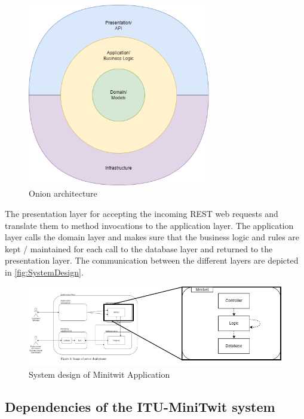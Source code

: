 \begin{figure}[!ht]
    \centering
    \includegraphics[width=80mm]{images/diagrams/ApplicationOverview.png}
    \captionsetup{justification=centering,margin=1cm}
    \caption{Onion architecture}
    \label{fig:onion_architecture}
\end{figure}


The presentation layer for accepting the incoming REST web requests and translate them to method invocations to the application layer. The application layer calls the domain layer and makes sure that the business logic and rules are kept / maintained for each call to the database layer and returned to the presentation layer. The communication between the different layers are depicted in \autoref{fig:SystemDesign}.

\begin{figure}[!ht]
    \centering
    \captionsetup{justification=centering,margin=1cm}
    \includegraphics[width=\linewidth]{images/diagrams/system-design-version2.drawio.png}
    \caption{System design of Minitwit Application}
    \label{fig:SystemDesign}
\end{figure}


\subsection{Dependencies of the ITU-MiniTwit system}

